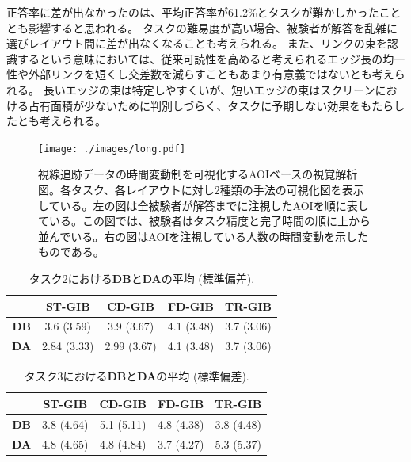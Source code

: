 \documentclass{kuee}
\begin{document}
正答率に差が出なかったのは、平均正答率が61.2\%とタスクが難かしかったこととも影響すると思われる。
タスクの難易度が高い場合、被験者が解答を乱雑に選びレイアウト間に差が出なくなることも考えられる。
また、リンクの束を認識するという意味においては、従来可読性を高めると考えられるエッジ長の均一性や外部リンクを短くし交差数を減らすこともあまり有意義ではないとも考えられる。
長いエッジの束は特定しやすくいが、短いエッジの束はスクリーンにおける占有面積が少ないために判別しづらく、タスクに予期しない効果をもたらしたとも考えられる。

\begin{figure}
  \begin{center}
    \label{fig:AOI-based-analisys}
    \texttt{[image: ./images/long.pdf]}
    \caption{視線追跡データの時間変動制を可視化するAOIベースの視覚解析図。各タスク、各レイアウトに対し2種類の手法の可視化図を表示している。左の図は全被験者が解答までに注視したAOIを順に表している。この図では、被験者はタスク精度と完了時間の順に上から並んでいる。右の図はAOIを注視している人数の時間変動を示したものである。}
  \end{center}
\end{figure}

\begin{table}[b]
  \begin{center}
  \caption{タスク2における{\bf DB}と{\bf DA}の平均 (標準偏差).}
  \label{table:gazecount-task12}
  \begin{tabular}{|c|c|c|c|c|} \hline
  & ST-GIB & CD-GIB & FD-GIB & TR-GIB \\ \hline
  {\bf DB} & 3.6 (3.59) & 3.9 (3.67) & 4.1 (3.48) & 3.7 (3.06) \\ \hline
  {\bf DA} & 2.84 (3.33) & 2.99 (3.67) & 4.1 (3.48) & 3.7 (3.06) \\ \hline
  \end{tabular}
  \end{center}
\end{table}

\begin{table}[b]
  \begin{center}
  \caption{タスク3における{\bf DB}と{\bf DA}の平均 (標準偏差).}
  \label{table:db_and_da_task3}
  \begin{tabular}{|c|c|c|c|c|} \hline
  & ST-GIB & CD-GIB & FD-GIB & TR-GIB \\ \hline
  {\bf DB} & 3.8 (4.64) & 5.1 (5.11) & 4.8 (4.38) & 3.8 (4.48) \\ \hline
  {\bf DA} & 4.8 (4.65) & 4.8 (4.84) & 3.7 (4.27) & 5.3 (5.37) \\ \hline
  \end{tabular}
  \end{center}
\end{table}
\end{document}
